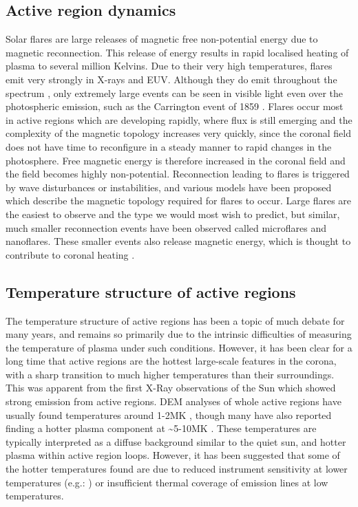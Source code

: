 \documentclass[namedreferences]{solarphysics}
\begin{document}
\subsection{Active region dynamics}
Solar flares are large releases of magnetic free non-potential energy due to magnetic reconnection.
This release of energy results in rapid localised heating of plasma to several million Kelvins.
Due to their very high temperatures, flares emit very strongly in X-rays and EUV.
Although they do emit throughout the spectrum \citep{Fletcher2011}, only extremely large events can be seen in visible light even over the photospheric emission, such as the Carrington event of 1859 \citep{Carrington1859}.
Flares occur most in active regions which are developing rapidly, where flux is still emerging and the complexity of the magnetic topology increases very quickly, since the coronal field does not have time to reconfigure in a steady manner to rapid changes in the photosphere.
Free magnetic energy is therefore increased in the coronal field and the field becomes highly non-potential.
Reconnection leading to flares is triggered by wave disturbances or instabilities, and various models have been proposed which describe the magnetic topology required for flares to occur.
Large flares are the easiest to observe and the type we would most wish to predict, but similar, much smaller reconnection events have been observed called microflares and nanoflares.
These smaller events also release magnetic energy, which is thought to contribute to coronal heating .

\subsection{Temperature structure of active regions}
The temperature structure of active regions has been a topic of much debate for many years, and remains so primarily due to the intrinsic difficulties of measuring the temperature of plasma under such conditions.
However, it has been clear for a long time that active regions are the hottest large-scale features in the corona, with a sharp transition to much higher temperatures than their surroundings.
This was apparent from the first X-Ray observations of the Sun which showed strong emission from active regions.
DEM analyses of whole active regions have usually found temperatures around 1-2MK \citep{Brosius1996,Kashyap1998,Schmelz2009,Reale2009,Warren2009a,Goryaev2010}, though many have also reported finding a hotter plasma component at \textasciitilde{}5-10MK \citep{Brosius1996,Kashyap1998,Schmelz2009,Reale2009}.
These temperatures are typically interpreted as a diffuse background similar to the quiet sun, and hotter plasma within active region loops.
However, it has been suggested that some of the hotter temperatures found are due to reduced instrument sensitivity at lower temperatures (e.g.: \citet{Boerner2013}) or insufficient thermal coverage of emission lines at low temperatures.
\end{document}
